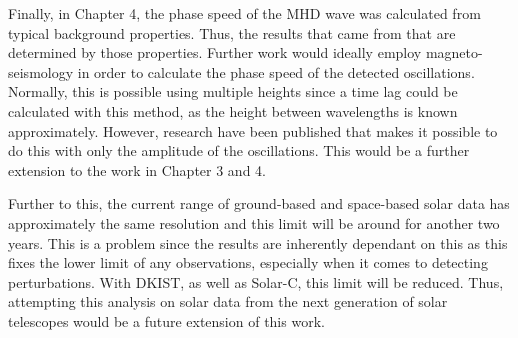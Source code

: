 Finally, in Chapter 4, the phase speed of the MHD wave was calculated from typical background properties.
Thus, the results that came from that are determined by those properties. 
Further work would ideally employ magneto-seismology in order to calculate the phase speed of the detected oscillations. 
Normally, this is possible using multiple heights since a time lag could be calculated with this method, as the height between wavelengths is known approximately.
However, research \citep{2015A&A...579A..73M} have been published that makes it possible to do this with only the amplitude of the oscillations.
This would be a further extension to the work in Chapter 3 and 4.


Further to this, the current range of ground-based and space-based solar data has approximately the same resolution and this limit will be around for another two years. 
This is a problem since the results are inherently dependant on this as this fixes the lower limit of any observations, especially when it comes to detecting perturbations.
With DKIST, as well as Solar-C, this limit will be reduced.
Thus, attempting this analysis on solar data from the next generation of solar telescopes would be a future extension of this work. 

